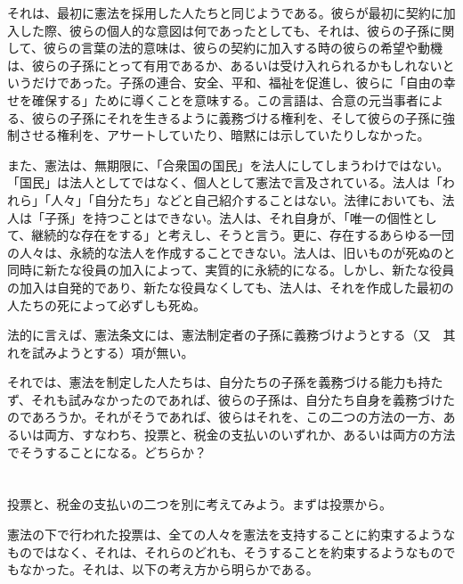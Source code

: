 \documentclass[dvipdfmx, uplatex, tate, landscape]{utbook}
\begin{document}
それは、最初に憲法を採用した人たちと同じようである。彼らが最初に契約に加入した際、彼らの個人的な意図は何であったとしても、それは、彼らの子孫に関して、彼らの言葉の法的意味は、彼らの契約に加入する時の彼らの希望や動機は、彼らの子孫にとって有用であるか、あるいは受け入れられるかもしれないというだけであった。子孫の連合、安全、平和、福祉を促進し、彼らに「自由の幸せを確保する」ために導くことを意味する。この言語は、合意の元当事者による、彼らの子孫にそれを生きるように義務づける権利を、そして彼らの子孫に強制させる権利を、アサートしていたり、暗黙には示していたりしなかった。

また、憲法は、無期限に、「合衆国の国民」を法人にしてしまうわけではない。「国民」は法人としてではなく、個人として憲法で言及されている。法人は「われら」「人々」「自分たち」などと自己紹介することはない。法律においても、法人は「子孫」を持つことはできない。法人は、それ自身が、「唯一の個性として、継続的な存在をする」と考えし、そうと言う。更に、存在するあらゆる一団の人々は、永続的な法人を作成することできない。法人は、旧いものが死ぬのと同時に新たな役員の加入によって、実質的に永続的になる。しかし、新たな役員の加入は自発的であり、新たな役員なくしても、法人は、それを作成した最初の人たちの死によって必ずしも死ぬ。

法的に言えば、憲法条文には、憲法制定者の子孫に義務づけようとする（又　其れを試みようとする）項が無い。

それでは、憲法を制定した人たちは、自分たちの子孫を義務づける能力も持たず、それも試みなかったのであれば、彼らの子孫は、自分たち自身を義務づけたのであろうか。それがそうであれば、彼らはそれを、この二つの方法の一方、あるいは両方、すなわち、投票と、税金の支払いのいずれか、あるいは両方の方法でそうすることになる。どちらか？

\chapter{}

投票と、税金の支払いの二つを別に考えてみよう。まずは投票から。

憲法の下で行われた投票は、全ての人々を憲法を支持することに約束するようなものではなく、それは、それらのどれも、そうすることを約束するようなものでもなかった。それは、以下の考え方から明らかである。
\end{document}
